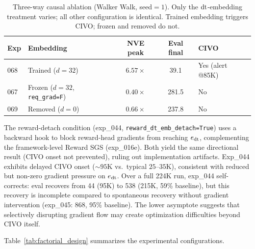 \begin{table}[h]
\centering
\caption{Three-way causal ablation (Walker Walk, seed${=}1$). Only the $\mathrm{dt}$-embedding treatment varies; all other configuration is identical. Trained embedding triggers CIVO; frozen and removed do not.}
\label{tab:causal_ablation}
\footnotesize
\begin{tabular}{llccl}
\toprule
\textbf{Exp} & \textbf{Embedding} & \textbf{NVE peak} & \textbf{Eval final} & \textbf{CIVO} \\
\midrule
\rowcolor{gray!15}
068 & Trained ($d{=}32$) & $6.57\times$ & 39.1 & Yes (alert @85K) \\
067 & Frozen ($d{=}32$, \texttt{req\_grad=F}) & $0.40\times$ & 281.5 & No \\
069 & Removed ($d{=}0$) & $0.66\times$ & 237.8 & No \\
\bottomrule
\end{tabular}
\end{table}

The reward-detach condition (exp\_044, \texttt{reward\_dt\_emb\_detach=True}) uses a backward hook to block reward-head gradients from reaching $e_{\mathrm{dt}}$, complementing the framework-level Reward SGS (exp\_016e). Both yield the same directional result (CIVO onset not prevented), ruling out implementation artifacts. Exp\_044 exhibits delayed CIVO onset (${\sim}95$K vs.\ typical $25$--$35$K), consistent with reduced but non-zero gradient pressure on $e_{\mathrm{dt}}$. Over a full 224K run, exp\_044 self-corrects: eval recovers from 44 (95K) to 538 (215K, 59\% baseline), but this recovery is incomplete compared to spontaneous recovery without gradient intervention (exp\_045: 868, 95\% baseline). The lower asymptote suggests that selectively disrupting gradient flow may create optimization difficulties beyond CIVO itself.

Table~\ref{tab:factorial_design} summarizes the experimental configurations.


